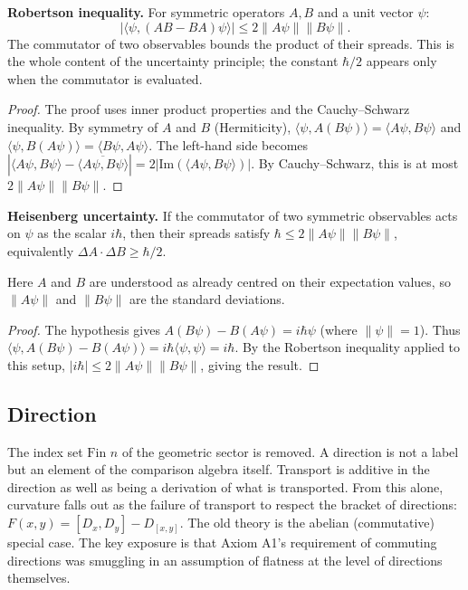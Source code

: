 \begin{theorem}
\textbf{Robertson inequality.} For symmetric operators $A, B$ and a unit vector $\psi$:
\[
\left| \langle \psi, (AB - BA) \psi \rangle \right| \leq 2 \|A\psi\| \|B\psi\|.
\]
The commutator of two observables bounds the product of their spreads. This is the whole content of the uncertainty principle; the constant $\hbar/2$ appears only when the commutator is evaluated.
\begin{proof}
The proof uses inner product properties and the Cauchy–Schwarz inequality. By symmetry of $A$ and $B$ (Hermiticity), $\langle \psi, A(B\psi) \rangle = \langle A\psi, B\psi \rangle$ and $\langle \psi, B(A\psi) \rangle = \langle B\psi, A\psi \rangle$. The left-hand side becomes $|\langle A\psi, B\psi \rangle - \overline{\langle A\psi, B\psi \rangle}| = 2|\text{Im}(\langle A\psi, B\psi \rangle)|$. By Cauchy–Schwarz, this is at most $2\|A\psi\| \|B\psi\|$.
\end{proof}
\end{theorem}

\begin{theorem}
\textbf{Heisenberg uncertainty.} If the commutator of two symmetric observables acts on $\psi$ as the scalar $i\hbar$, then their spreads satisfy $\hbar \leq 2\|A\psi\| \|B\psi\|$, equivalently $\Delta A \cdot \Delta B \geq \hbar/2$.

Here $A$ and $B$ are understood as already centred on their expectation values, so $\|A\psi\|$ and $\|B\psi\|$ are the standard deviations.
\begin{proof}
The hypothesis gives $A(B\psi) - B(A\psi) = i\hbar \psi$ (where $\|\psi\| = 1$). Thus $\langle \psi, A(B\psi) - B(A\psi) \rangle = i\hbar \langle \psi, \psi \rangle = i\hbar$. By the Robertson inequality applied to this setup, $|i\hbar| \leq 2\|A\psi\| \|B\psi\|$, giving the result.
\end{proof}
\end{theorem}

\subsection{Direction}

The index set $\text{Fin } n$ of the geometric sector is removed. A direction is not a label but an element of the comparison algebra itself. Transport is additive in the direction as well as being a derivation of what is transported. From this alone, curvature falls out as the failure of transport to respect the bracket of directions: $F(x,y) = [D_x, D_y] - D_{[x,y]}$. The old theory is the abelian (commutative) special case. The key exposure is that Axiom A1's requirement of commuting directions was smuggling in an assumption of flatness at the level of directions themselves.

